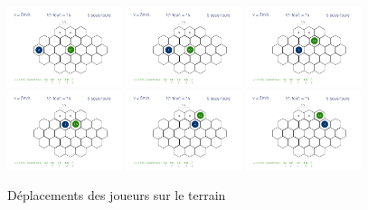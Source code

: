 \begin{figure}[h!]
    \centering
    \includegraphics[width=0.3\textwidth]{../TurnModel/TurnModel0.png}
    \includegraphics[width=0.3\textwidth]{../TurnModel/TurnModel1.png}
    \includegraphics[width=0.3\textwidth]{../TurnModel/TurnModel2.png}
    \\
    \includegraphics[width=0.3\textwidth]{../TurnModel/TurnModel3.png}
    \includegraphics[width=0.3\textwidth]{../TurnModel/TurnModel4.png}
    \includegraphics[width=0.3\textwidth]{../TurnModel/TurnModel5.png}
    \caption{\label{fig:TurnModel} Déplacements des joueurs sur le terrain}
\end{figure}

